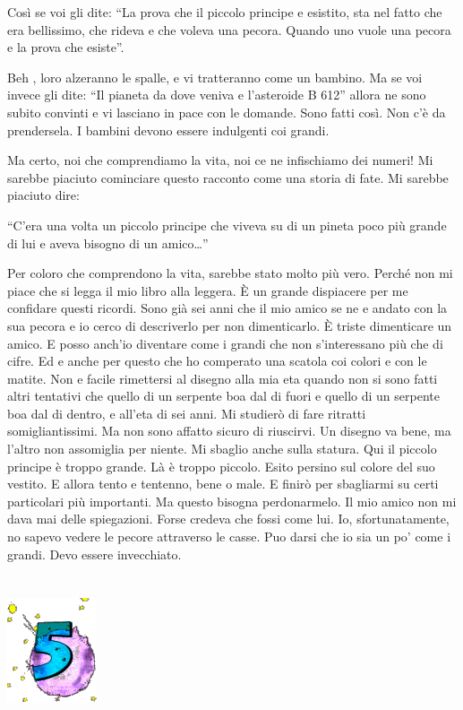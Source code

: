 \documentclass[11pt]{scrbook}
\begin{document}
Così se voi gli dite: ``La prova che il piccolo principe e esistito, sta
nel fatto che era bellissimo, che rideva e che voleva una pecora. Quando
uno vuole una pecora e la prova che esiste''.

Beh , loro alzeranno le spalle, e vi tratteranno come un bambino. Ma se
voi invece gli dite: ``Il pianeta da dove veniva e l'asteroide B 612''
allora ne sono subito convinti e vi lasciano in pace con le domande.
Sono fatti così. Non c'è da prendersela. I bambini devono essere
indulgenti coi grandi.

Ma certo, noi che comprendiamo la vita, noi ce ne infischiamo dei
numeri! Mi sarebbe piaciuto cominciare questo racconto come una storia
di fate. Mi sarebbe piaciuto dire:

``C'era una volta un piccolo principe che viveva su di un pineta poco
più grande di lui e aveva bisogno di un amico\ldots{}''

Per coloro che comprendono la vita, sarebbe stato molto più vero. Perché
non mi piace che si legga il mio libro alla leggera. È un grande
dispiacere per me confidare questi ricordi. Sono già sei anni che il mio
amico se ne e andato con la sua pecora e io cerco di descriverlo per non
dimenticarlo. È triste dimenticare un amico. E posso anch'io diventare
come i grandi che non s'interessano più che di cifre. Ed e anche per
questo che ho comperato una scatola coi colori e con le matite. Non e
facile rimettersi al disegno alla mia eta quando non si sono fatti altri
tentativi che quello di un serpente boa dal di fuori e quello di un
serpente boa dal di dentro, e all'eta di sei anni. Mi studierò di fare
ritratti somigliantissimi. Ma non sono affatto sicuro di riuscirvi. Un
disegno va bene, ma l'altro non assomiglia per niente. Mi sbaglio anche
sulla statura. Qui il piccolo principe è troppo grande. Là è troppo
piccolo. Esito persino sul colore del suo vestito. E allora tento e
tentenno, bene o male. E finirò per sbagliarmi su certi particolari più
importanti. Ma questo bisogna perdonarmelo. Il mio amico non mi dava mai
delle spiegazioni. Forse credeva che fossi come lui. Io,
sfortunatamente, no sapevo vedere le pecore attraverso le casse. Puo
darsi che io sia un po' come i grandi. Devo essere invecchiato.

\chapter{}
\begin{center}
\includegraphics{img/chapter5}
\end{center}
\end{document}
